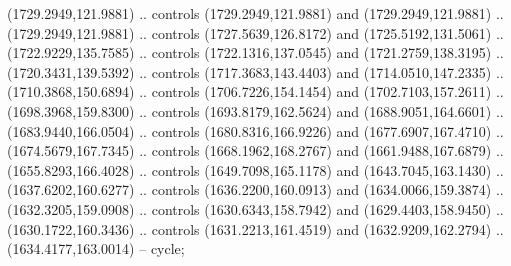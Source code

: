 \begin{scope}[shift={(-22.88722,-49.76189)}]
\begin{scope}[shift={(-739.46591,328.36782)}]
      (1729.2949,121.9881) .. controls (1729.2949,121.9881) and (1729.2949,121.9881)
      .. (1729.2949,121.9881) .. controls (1727.5639,126.8172) and
      (1725.5192,131.5061) .. (1722.9229,135.7585) .. controls (1722.1316,137.0545)
      and (1721.2759,138.3195) .. (1720.3431,139.5392) .. controls
      (1717.3683,143.4403) and (1714.0510,147.2335) .. (1710.3868,150.6894) ..
      controls (1706.7226,154.1454) and (1702.7103,157.2611) .. (1698.3968,159.8300)
      .. controls (1693.8179,162.5624) and (1688.9051,164.6601) ..
      (1683.9440,166.0504) .. controls (1680.8316,166.9226) and (1677.6907,167.4710)
      .. (1674.5679,167.7345) .. controls (1668.1962,168.2767) and
      (1661.9488,167.6879) .. (1655.8293,166.4028) .. controls (1649.7098,165.1178)
      and (1643.7045,163.1430) .. (1637.6202,160.6277) .. controls
      (1636.2200,160.0913) and (1634.0066,159.3874) .. (1632.3205,159.0908) ..
      controls (1630.6343,158.7942) and (1629.4403,158.9450) .. (1630.1722,160.3436)
      .. controls (1631.2213,161.4519) and (1632.9209,162.2794) ..
      (1634.4177,163.0014) -- cycle;


\end{scope}
\end{scope}
